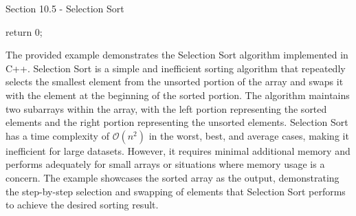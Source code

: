 \begin{notes}{Section 10.5 - Selection Sort}
\begin{highlight}
\begin{code}[C++]
{        return 0;
    }
    \end{code}
        The provided example demonstrates the Selection Sort algorithm implemented in C++. Selection Sort is a simple and inefficient sorting algorithm that repeatedly selects the smallest element from the unsorted portion of the array and swaps it with the element at the beginning of the sorted portion. The algorithm maintains two subarrays
        within the array, with the left portion representing the sorted elements and the right portion representing the unsorted elements. Selection Sort has a time complexity of $\mathcal{O}(n^2)$ in the worst, best, and average cases, making it inefficient for large datasets. However, it requires minimal additional memory and performs adequately
        for small arrays or situations where memory usage is a concern. The example showcases the sorted array as the output, demonstrating the step-by-step selection and swapping of elements that Selection Sort performs to achieve the desired sorting result.
    \end{highlight}
\end{notes}

